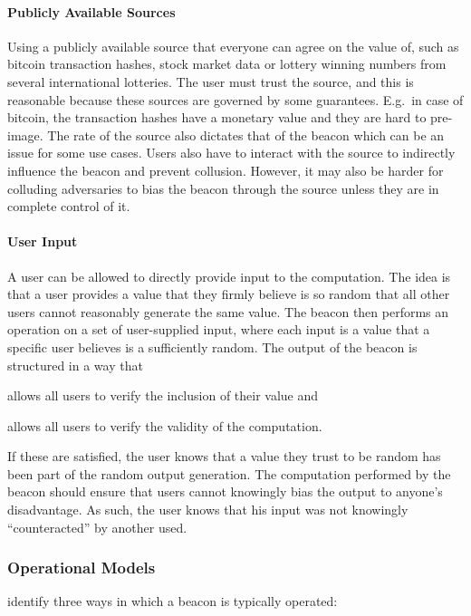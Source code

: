 \paragraph{Publicly Available Sources} Using a publicly available source that everyone can agree on the value of, such as bitcoin transaction hashes, stock market data or lottery winning numbers from several international lotteries.
The user must trust the source, and this is reasonable because these sources are governed by some guarantees. E.g.\ in case of bitcoin, the transaction hashes have a monetary value and they are hard to pre-image. The rate of the source also dictates that of the beacon which can be an issue for some use cases. Users also have to interact with the source to indirectly influence the beacon and prevent collusion. However, it may also be harder for colluding adversaries to bias the beacon through the source unless they are in complete control of it.

\paragraph{User Input}
A user can be allowed to directly provide input to the computation.
The idea is that a user provides a value that they firmly believe is so random that all other users cannot reasonably generate the same value.
The beacon then performs an operation on a set of user-supplied input, where each input is a value that a specific user believes is a sufficiently random. The output of the beacon is structured in a way that
\begin{eletterate*}
    \item allows all users to verify the inclusion of their value and
    \item allows all users to verify the validity of the computation.
\end{eletterate*}

If these are satisfied, the user knows that a value they trust to be random has been part of the random output generation. The computation performed by the beacon should ensure that users cannot knowingly bias the output to anyone's disadvantage. As such, the user knows that his input was not knowingly \enquote{counteracted} by another used.

\subsubsection{Operational Models}
 identify three ways in which a beacon is typically operated:

